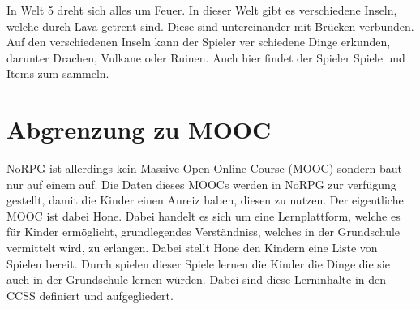 In Welt 5 dreht sich alles um Feuer. In dieser Welt gibt es verschiedene Inseln, welche durch Lava getrent sind. Diese sind untereinander mit Brücken verbunden. Auf den verschiedenen Inseln kann der Spieler ver schiedene Dinge erkunden, darunter Drachen, Vulkane oder Ruinen. Auch hier findet der Spieler Spiele und Items zum sammeln.

	
\section{Abgrenzung zu MOOC}

NoRPG ist allerdings kein Massive Open Online Course (MOOC) sondern baut nur auf einem auf. Die Daten dieses MOOCs werden in NoRPG zur verfügung gestellt, damit die Kinder einen Anreiz haben, diesen zu nutzen. Der eigentliche MOOC ist dabei Hone. Dabei handelt es sich um eine Lernplattform, welche es für Kinder ermöglicht, grundlegendes Verständniss, welches in der Grundschule vermittelt wird, zu erlangen. Dabei stellt Hone den Kindern eine Liste von Spielen bereit. Durch spielen dieser Spiele lernen die Kinder die Dinge die sie auch in der Grundschule lernen würden. Dabei sind diese Lerninhalte in den CCSS definiert und aufgegliedert.